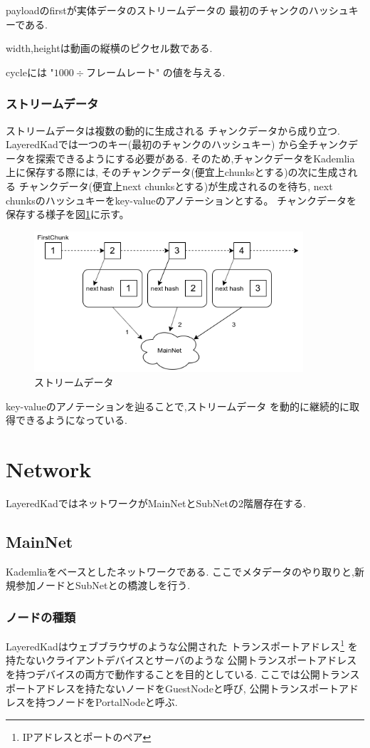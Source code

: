 \documentclass[sotsuron]{jcsie}
\begin{document}
payloadのfirstが実体データのストリームデータの
最初のチャンクのハッシュキーである.

width,heightは動画の縦横のピクセル数である.

cycleには "$ 1000 \div フレームレート $" の値を与える.

\subsubsection{ストリームデータ}
ストリームデータは複数の動的に生成される
チャンクデータから成り立つ.
LayeredKadでは一つのキー(最初のチャンクのハッシュキー)
から全チャンクデータを探索できるようにする必要がある.
そのため,チャンクデータをKademlia上に保存する際には,
そのチャンクデータ(便宜上chunksとする)の次に生成される
チャンクデータ(便宜上next chunksとする)が生成されるのを待ち,
next chunksのハッシュキーをkey-valueのアノテーションとする。
チャンクデータを保存する様子を図\ref{fig:streamdata}に示す。
\begin{figure}[H]
	\centering
	\includegraphics[width=10cm]{./assets/image/stream.png}
	\caption{ストリームデータ}
	\label{fig:streamdata}
\end{figure}

key-valueのアノテーションを辿ることで,ストリームデータ
を動的に継続的に取得できるようになっている.

\section{Network}
LayeredKadではネットワークがMainNetとSubNetの2階層存在する.

\subsection{MainNet}
Kademliaをベースとしたネットワークである.
ここでメタデータのやり取りと,新規参加ノードとSubNetとの橋渡しを行う.

\subsubsection{ノードの種類}
LayeredKadはウェブブラウザのような公開された
トランスポートアドレス\footnote{IPアドレスとポートのペア}
を持たないクライアントデバイスとサーバのような
公開トランスポートアドレスを持つデバイスの両方で動作することを目的としている.
ここでは公開トランスポートアドレスを持たないノードをGuestNodeと呼び,
公開トランスポートアドレスを持つノードをPortalNodeと呼ぶ.
\end{document}
